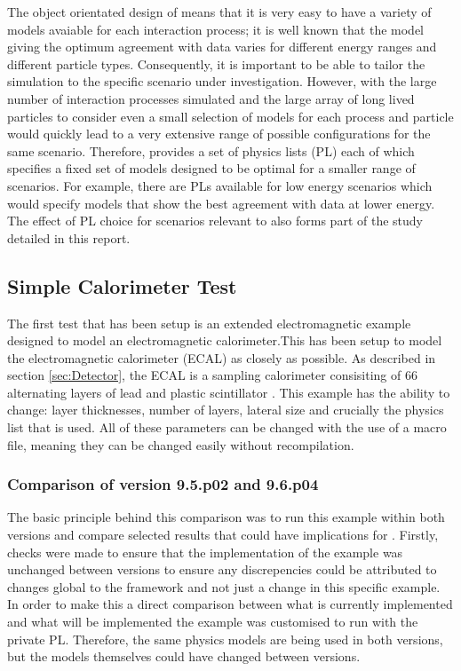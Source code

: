 The object orientated design of \geant means that it is very easy to have a variety of models avaiable for each interaction process; it is well known that the model giving the optimum agreement with data varies for different energy ranges and different particle types.  Consequently, it is important to be able to tailor the simulation to the specific scenario under investigation.  However, with the large number of interaction processes simulated and the large array of long lived particles to consider even a small selection of models for each process and particle would quickly lead to a very extensive range of possible configurations for the same scenario.  Therefore, \geant provides a set of physics lists (PL) each of which specifies a fixed set of models designed to be optimal for a smaller range of scenarios.  For example, there are PLs available for low energy scenarios which would specify models that show the best agreement with data at lower energy.  The effect of PL choice for scenarios relevant to \lhcb also forms part of the study detailed in this report.


\subsection{Simple Calorimeter Test}
\label{sec:Simple Calorimeter Test}
The first test that has been setup is an extended electromagnetic \geant example designed to model an electromagnetic calorimeter.This has been setup to model the \lhcb electromagnetic calorimeter (ECAL) as closely as possible. As described in section \ref{sec:Detector}, the \lhcb ECAL is a sampling calorimeter consisiting of 66 alternating layers of lead and plastic scintillator \cite{LHCb-TDR-002}.  This example has the ability to change: layer thicknesses, number of layers, lateral size and crucially the physics list that is used. All of these parameters can be changed with the use of a \geant macro file, meaning they can be changed easily without recompilation. 

\subsubsection{Comparison of \geant version 9.5.p02 and 9.6.p04}
The basic principle behind this comparison was to run this example within both \geant versions and compare selected results that could have implications for \lhcb.  Firstly, checks were made to ensure that the implementation of the example was unchanged between versions to ensure any discrepencies could be attributed to changes global to the \geant framework and not just a change in this specific example.  In order to make this a direct comparison between what is currently implemented and what will be implemented the example was customised to run with the \lhcb private PL.  Therefore, the same physics models are being used in both versions, but the models themselves could have changed between versions.

